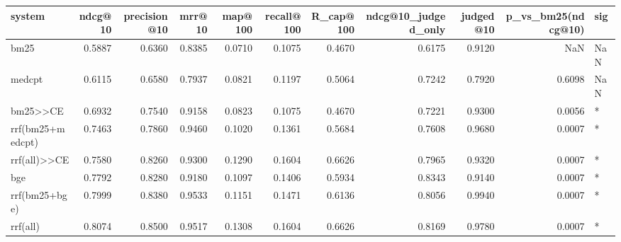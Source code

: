 \begin{tabular}{lrrrrrrrrrl}
\toprule
system & ndcg@10 & precision@10 & mrr@10 & map@100 & recall@100 & R_cap@100 & ndcg@10_judged_only & judged@10 & p_vs_bm25(ndcg@10) & sig \\
\midrule
bm25 & 0.5887 & 0.6360 & 0.8385 & 0.0710 & 0.1075 & 0.4670 & 0.6175 & 0.9120 & NaN & NaN \\
medcpt & 0.6115 & 0.6580 & 0.7937 & 0.0821 & 0.1197 & 0.5064 & 0.7242 & 0.7920 & 0.6098 & NaN \\
bm25>>CE & 0.6932 & 0.7540 & 0.9158 & 0.0823 & 0.1075 & 0.4670 & 0.7221 & 0.9300 & 0.0056 & * \\
rrf(bm25+medcpt) & 0.7463 & 0.7860 & 0.9460 & 0.1020 & 0.1361 & 0.5684 & 0.7608 & 0.9680 & 0.0007 & * \\
rrf(all)>>CE & 0.7580 & 0.8260 & 0.9300 & 0.1290 & 0.1604 & 0.6626 & 0.7965 & 0.9320 & 0.0007 & * \\
bge & 0.7792 & 0.8280 & 0.9180 & 0.1097 & 0.1406 & 0.5934 & 0.8343 & 0.9140 & 0.0007 & * \\
rrf(bm25+bge) & 0.7999 & 0.8380 & 0.9533 & 0.1151 & 0.1471 & 0.6136 & 0.8056 & 0.9940 & 0.0007 & * \\
rrf(all) & 0.8074 & 0.8500 & 0.9517 & 0.1308 & 0.1604 & 0.6626 & 0.8169 & 0.9780 & 0.0007 & * \\
\bottomrule
\end{tabular}
